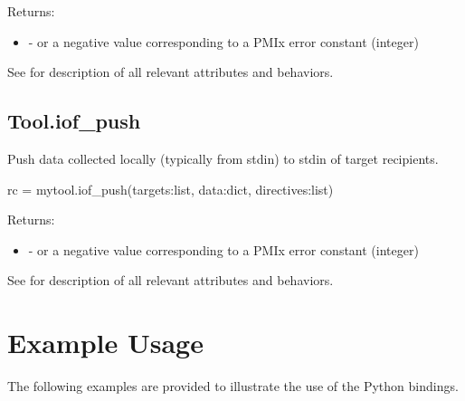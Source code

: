 Returns:

\begin{itemize}
    \item {} -  or a negative value corresponding to a PMIx error constant (integer)
\end{itemize}

See  for description of all relevant attributes and behaviors.


\subsection{Tool.iof_push}

\summary

Push data collected locally (typically from stdin) to
stdin of target recipients.

\format

\pyspecificstart
\begin{codepar}
rc = mytool.iof_push(targets:list, data:dict, directives:list)
\end{codepar}
\pyspecificend

\begin{arglist}
\end{arglist}

Returns:

\begin{itemize}
    \item {} -  or a negative value corresponding to a PMIx error constant (integer)
\end{itemize}

See  for description of all relevant attributes and behaviors.


\section{Example Usage}
\label{app:python:examples}

The following examples are provided to illustrate the use of the Python bindings.


